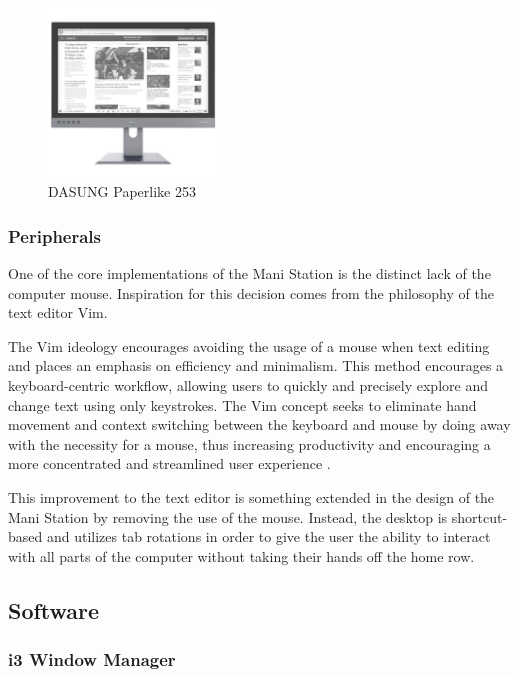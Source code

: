 \documentclass[letterpaper,twocolumn,10pt]{article}
\begin{document}
\begin{figure}[!ht]
\caption{DASUNG Paperlike 253}
\centering
\includegraphics[width=0.4\textwidth]{paperlike.jpg}
\end{figure}

\subsubsection{Peripherals}

One of the core implementations of the Mani Station is the distinct lack of the computer mouse. Inspiration for this decision comes from the philosophy of the text editor Vim.

The Vim ideology encourages avoiding the usage of a mouse when text editing and places an emphasis on efficiency and minimalism. This method encourages a keyboard-centric workflow, allowing users to quickly and precisely explore and change text using only keystrokes. The Vim concept seeks to eliminate hand movement and context switching between the keyboard and mouse by doing away with the necessity for a mouse, thus increasing productivity and encouraging a more concentrated and streamlined user experience \cite{vim}.

This improvement to the text editor is something extended in the design of the Mani Station by removing the use of the mouse. Instead, the desktop is shortcut-based and utilizes tab rotations in order to give the user the ability to interact with all parts of the computer without taking their hands off the home row.

\subsection{Software}
\subsubsection{i3 Window Manager}
\end{document}

